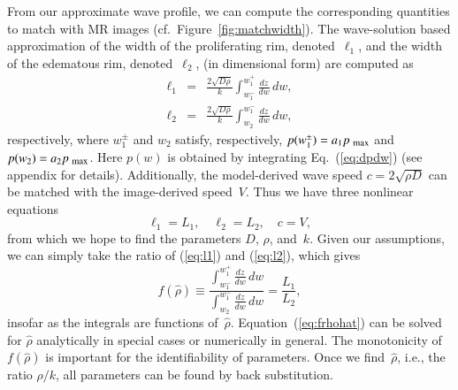 \documentclass{aims}
\numberwithin{equation}{section}
\begin{document}
From our approximate wave profile, we can compute the corresponding
quantities to match with MR images (cf.\ Figure~\ref{fig:matchwidth}). The 
wave-solution based approximation of the width of the proliferating rim, 
denoted~$\ell_1$, and the width of the edematous rim, denoted~$\ell_2$,
(in dimensional form) are computed as
\begin{subequations}
\begin{eqnarray}
\ell_{1} & = & \frac{2\sqrt{D\rho}}{k}
  \int_{w_{1}^{-}}^{w_{1}^+} \frac{dz}{dw} \,dw,\label{eq:l1}\\
\ell_{2} & = & \frac{2\sqrt{D\rho}}{k}
  \int_{w_{2}}^{w_{1}^-} \frac{dz}{dw}\, dw,\label{eq:l2}
\end{eqnarray}
\end{subequations}
respectively, where $w_{1}^{\pm}$ and $w_{2}$ satisfy, respectively,
$p(w_{1}^{\pm})=a_{1}p_{\mbox{\scriptsize max}}$ and
$p(w_{2})=a_{2}p_{\mbox{\scriptsize max}}$.  Here
$p(w)$ is obtained by integrating Eq.~(\ref{eq:dpdw}) (see appendix for details).
Additionally, the model-derived wave speed $c=2\sqrt{\rho D}$
can be matched with the image-derived speed~$V$.
Thus we have three nonlinear equations
\begin{equation}
\ell_{1}=L_{1},\quad \ell_{2}=L_{2},\quad c=V,
\label{eq:l1l2c}
\end{equation}
from which we hope to find the parameters $D$, $\rho$, and~$k$.  Given our
assumptions, we can simply take the ratio of
(\ref{eq:l1}) and (\ref{eq:l2}), which gives
\begin{equation}
f(\hat{\rho})\equiv
\frac{\displaystyle\int_{w_{1}^{-}}^{w_{1}^{+}}\frac{dz}{dw}\,dw}
  {\displaystyle\int_{w_{2}}^{w_{1}^{-}}\frac{dz}{dw}\,dw}=
  \frac{L_{1}}{L_{2}},
\label{eq:frhohat}
\end{equation}
insofar as the integrals are functions of~$\hat{\rho}$. 
Equation~(\ref{eq:frhohat})
can be solved for $\hat{\rho}$ analytically in special cases or numerically
in general.  The monotonicity of $f(\hat{\rho})$ is important
for the identifiability of parameters. Once we find~$\hat{\rho}$, i.e., the ratio 
$\rho/k$, all parameters can be found by back substitution.
\end{document}
